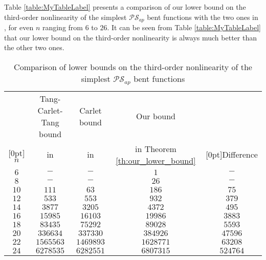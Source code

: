 \documentclass[preprint,10pt]{elsarticle}
\newcommand{\0}{\textbf{0}}
\newcommand{\1}{\textbf{1}}
\theoremstyle{plain}
\begin{document}
    Table \ref{table:MyTableLabel} presents a comparison of our lower bound on the third-order nonlinearity of the simplest $\mathcal{PS}_{ap}$ bent functions with the two ones in \cite{Carlet2011NL_Profile_Dillon,TangCT2013NL_2bent}, for even $n$ ranging from $6$ to $26$.
    It can be seen from Table \ref{table:MyTableLabel} that our lower bound on the third-order nonlinearity is always much better than the other two ones.
 \newcommand{\rb}[1]{\raisebox{1.5ex}[0pt]{#1}}
    \begin{table}
        \centering
        \caption{Comparison of lower bounds on the third-order nonlinearity of the simplest $\mathcal{PS}_{ap}$ bent functions}
        \begin{threeparttable}
            \begin{tabular}{|c|c|c|c|c|}
                \hline
                        & Tang-Carlet-Tang bound      & Carlet bound                            & Our bound& \\
                \rb{$n$}& in \cite{TangCT2013NL_2bent}& in \cite{Carlet2011NL_Profile_Dillon} & in Theorem \ref{th:our_lower_bound}     &\rb{Difference\tnote{1}}   \\
                \hline
                $6  $ &  $ -           $       & $ -        $     & $ 1        $     & $  -       $ \\  \hline
                $8  $ &  $ -           $       & $ -        $     & $ 26       $     & $  -       $ \\  \hline
                $10 $ &  $ 111         $       & $ 63       $     & $ 186      $     & $  75      $ \\  \hline
                $12 $ &  $ 533         $       & $ 553      $     & $ 932      $     & $  379     $ \\  \hline
                $14 $ &  $ 3877        $       & $ 3205     $     & $ 4372     $     & $  495     $ \\  \hline
                $16 $ &  $ 15985       $       & $ 16103    $     & $ 19986    $     & $  3883    $ \\  \hline
                $18 $ &  $ 83435       $       & $ 75292    $     & $ 89028    $     & $  5593    $ \\  \hline
                $20 $ &  $ 336634      $       & $ 337330   $     & $ 384926   $     & $  47596   $ \\  \hline
                $22 $ &  $ 1565563     $       & $ 1469893  $     & $ 1628771  $     & $  63208   $ \\  \hline
                $24 $ &  $ 6278535     $       & $ 6282551  $     & $ 6807315  $     & $  524764  $ \\  \hline

\end{tabular}
\end{threeparttable}
\end{table}
\end{document}
